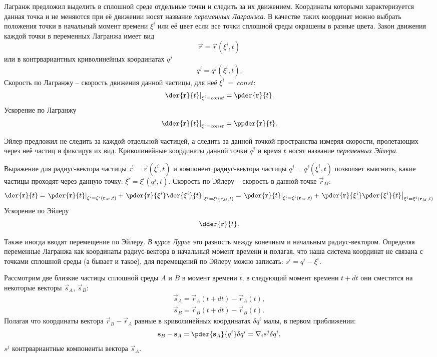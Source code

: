 
Лагранж предложил выделить в сплошной среде отдельные точки и следить за их
движением. Координаты которыми характеризуется данная точка и не меняются при
её движении носят название \emph{переменных Лагранжа}. В качестве таких
координат можно выбрать положения точки в начальный момент времени \( \xi^i \)
или её цвет если все точки сплошной среды окрашены в разные цвета.
Закон движения каждой точки в переменных Лагранжа имеет вид
\[
    \vec{r} = \vec{r}(\xi^i, t)
\] 
или в контрвариантных криволинейных координатах \( q^j \)
\[
    q^j = q^j(\xi^i, t).
\]
Скорость по Лагранжу -- скорость движения данной частицы, для неё
\( \xi^i~=~const \):
\[
    \left.\der{\vec{r}}{t}\right|_{\xi^i = const} = \pder{\vec{r}}{t}.
\]
Ускорение по Лагранжу   
\[
    \left.\dder{\vec{r}}{t}\right|_{\xi^i = const} = \ppder{\vec{r}}{t}.
\]
        
Эйлер предложил не следить за каждой отдельной частицей, а следить за данной
точкой пространства измеряя скорости, пролетающих через неё частиц и фиксируя
их вид. Криволинейные координаты данной точки \( q^j \)  и время \( t \) носят
название \emph{переменных Эйлера}.

Выражение для радиус-вектора частицы \( \vec{r} = \vec{r}(\xi^i, t) \) и
компонент радиус-вектора частицы \( q^j = q^j (\xi^i, t) \) позволяет выяснить,
какие частицы проходят через данную точку: \( \xi^i = \xi^i(q^j, t) \).
Скорость по Эйлеру -- скорость в данной точке \( \vec{r}_{M} \):
\[
    \der{\vec{r}}{t} = 
    \left.\pder{\vec{r}}{t}\right|_{\xi^i = \xi^i(\vec{r}_{M}, t)} +
    \left.\pder{\vec{r}}{\xi^i}
    \der{\xi^i}{t}\right|_{\xi^i = \xi^i(\vec{r}_{M}, t)} =
    \left.\pder{\vec{r}}{t}\right|_{\xi^i = \xi^i(\vec{r}_{M}, t)} +
    \left.\pder{\vec{r}}{\xi^i}
    \pder{\xi^i}{t}\right|_{\xi^i = \xi^i(\vec{r}_{M}, t)}
\]
Ускорение по Эйлеру
\[
    \dder{\vec{r}}{t}.
\]

Также иногда вводят перемещение по Эйлеру. \emph{В курсе Лурье} это разность
между конечным и начальным радиус-вектором. Определяя переменные Лагранжа как
координаты радиус-вектора в начальный момент времени и полагая, что наша
система координат не связана с точками сплошной среды (а бывает и такое), для
перемещений по Эйлеру можно записать: \( s^i = q^i - \xi^i \).
    
Рассмотрим две близкие частицы сплошной среды \( A \) и \( B \) в момент
времени \( t \), в следующий момент времени \( t+dt \) они сместятся на
некоторые векторы \( \vec{s}_{A} \), \( \vec{s}_{B} \):
\begin{gather*}
    \vec{s}_{A} = \vec{r}_{A}(t+dt) -\vec{r}_{A}(t),\\
    \vec{s}_{B} = \vec{r}_{B}(t+dt) -\vec{r}_{B}(t).
\end{gather*}
Полагая что координаты вектора \( \vec{r}_{B} - \vec{r}_{A} \) равные в
криволинейных координатах \( \delta q^i \) малы, в первом приближении:
\[
    \vec{s}_{B} - \vec{s}_{A} = \pder{ \vec{s}_{A}}{q^i}\delta q^i 
    = \nabla_i s^j \delta q^i,
\]
\( s^j \) контрвариантные компоненты вектора \( \vec{s}_{A} \).

